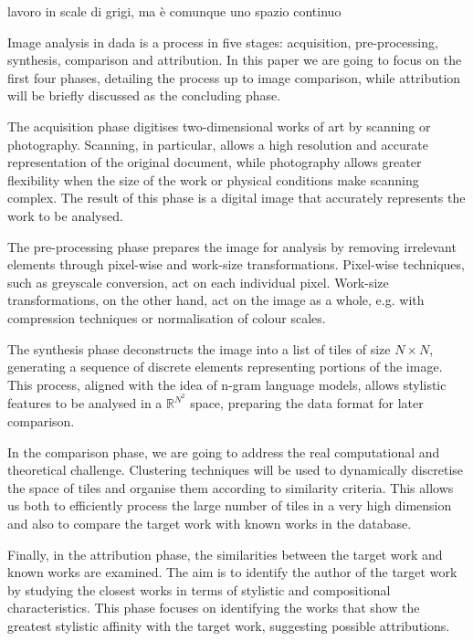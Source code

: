 \begin{note} lavoro in scale di grigi, ma è comunque uno spazio continuo \end{note}

\noindent Image analysis in \gls{dada} is a process in five stages: acquisition, pre-processing, synthesis, comparison and attribution. In this paper we are going to focus on the first four phases, detailing the process up to image comparison, while attribution will be briefly discussed as the concluding phase.

\noindent The acquisition phase digitises two-dimensional works of art by scanning or photography. Scanning, in particular, allows a high resolution and accurate representation of the original document, while photography allows greater flexibility when the size of the work or physical conditions make scanning complex. The result of this phase is a digital image that accurately represents the work to be analysed.

\noindent The pre-processing phase prepares the image for analysis by removing irrelevant elements through pixel-wise and work-size transformations. Pixel-wise techniques, such as greyscale conversion, act on each individual pixel. Work-size transformations, on the other hand, act on the image as a whole, e.g. with compression techniques or normalisation of colour scales.

\noindent The synthesis phase deconstructs the image into a list of tiles of size $N\times N$, generating a sequence of discrete elements representing portions of the image. This process, aligned with the idea of n-gram language models, allows stylistic features to be analysed in a $\mathbb{R}^{N^2}$ space, preparing the data format for later comparison.

\noindent In the comparison phase, we are going to address the real computational and theoretical challenge. Clustering techniques will be used to dynamically discretise the space of tiles and organise them according to similarity criteria. This allows us both to efficiently process the large number of tiles in a very high dimension and also to compare the target work with known works in the database.

\noindent Finally, in the attribution phase, the similarities between the target work and known works are examined. The aim is to identify the author of the target work by studying the closest works in terms of stylistic and compositional characteristics. This phase focuses on identifying the works that show the greatest stylistic affinity with the target work, suggesting possible attributions.

